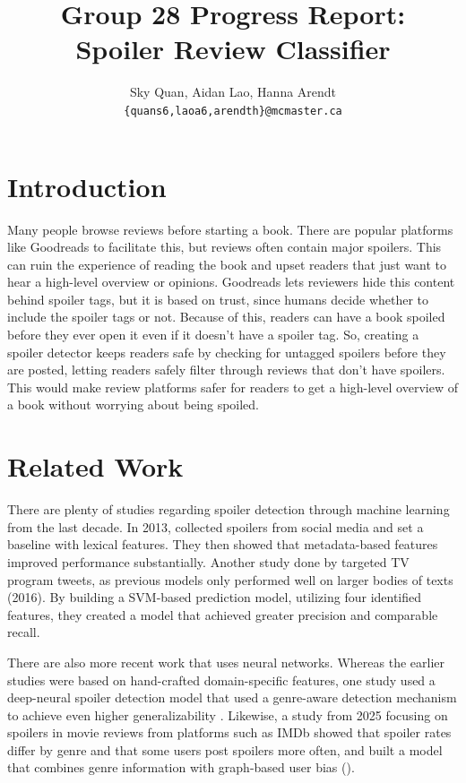 \documentclass[11pt]{article}
\title{Group 28 Progress Report:\\Spoiler Review Classifier}
\author{Sky Quan, Aidan Lao, Hanna Arendt \\
  \texttt{\{quans6,laoa6,arendth\}@mcmaster.ca} }
\begin{document}
\maketitle

\section{Introduction}

Many people browse reviews before starting a book. There are popular platforms like Goodreads to facilitate this, but reviews often contain major spoilers. This can ruin the experience of reading the book and upset readers that just want to hear a high-level overview or opinions. Goodreads lets reviewers hide this content behind spoiler tags, but it is based on trust, since humans decide whether to include the spoiler tags or not. Because of this, readers can have a book spoiled before they ever open it even if it doesn't have a spoiler tag.  So, creating a spoiler detector keeps readers safe by checking for untagged spoilers before they are posted, letting readers safely filter through reviews that don't have spoilers. This would make review platforms safer for readers to get a high-level overview of a book without worrying about being spoiled.

\section{Related Work}


There are plenty of studies regarding spoiler detection through machine learning from the last decade. In 2013, \citeauthor{spoiler-alert} collected spoilers from social media and set a baseline with lexical features. They then showed that metadata-based features improved performance substantially. Another study done by \citeauthor{JEON2016220} targeted TV program tweets, as previous models only performed well on larger bodies of texts (2016). By building a SVM-based prediction model, utilizing four identified features, they created a model that achieved greater precision and comparable recall. 

There are also more recent work that uses neural networks. Whereas the earlier studies were based on hand-crafted domain-specific features, one study used a deep-neural spoiler detection model that used a genre-aware detection mechanism to achieve even higher generalizability \cite{neural2018}. Likewise, a study from 2025 focusing on spoilers in movie reviews from platforms such as IMDb showed that spoiler rates differ by genre and that some users post spoilers more often, and built a model that combines genre information with graph-based user bias (\citeauthor{genre2025}).
\end{document}
